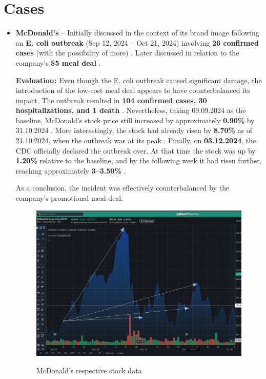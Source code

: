 \documentclass[12pt,a4paper]{article}
\begin{document}
\section{Cases}
\begin{itemize}
    \item \textbf{McDonald's} -- Initially discussed in the context of its brand image following an \textbf{E. coli outbreak} (Sep 12, 2024 – Oct 21, 2024) involving \textbf{26 confirmed cases} (with the possibility of more) \cite{wikipedia}. Later discussed in relation to the company’s \textbf{\$5 meal deal} \cite{cnbc}. 
\vspace{0.3cm}

\textbf{Evaluation:} Even though the E. coli outbreak caused significant damage, 
the introduction of the low-cost meal deal appears to have counterbalanced its impact. 
The outbreak resulted in \textbf{104 confirmed cases, 30 hospitalizations, and 1 death} \cite{wikipedia}. 
Nevertheless, taking 09.09.2024 as the baseline, McDonald’s stock price still increased by approximately \textbf{0.90\%} by 31.10.2024 \cite{MCD}. 
More interestingly, the stock had already risen by \textbf{8.70\%} as of 21.10.2024, when the outbreak was at its peak \cite{MCD}. 
Finally, on \textbf{03.12.2024}, the CDC officially declared the outbreak over. 
At that time the stock was up by \textbf{1.20\%} relative to the baseline, and by the following week it had risen further, reaching approximately \textbf{3--3.50\%} \cite{MCD}.

As a conclusion, the incident was effectively counterbalanced by the company’s promotional meal deal.
\vspace{0.7cm}

\begin{figure}[H]
    \centering
    \includegraphics[width=0.85\linewidth]{mcdonalds.jpeg}
    \caption{McDonald's respective stock data}\cite{MCD}
    \label{fig:mcd}
\end{figure}
\FloatBarrier





\end{itemize}
\end{document}

